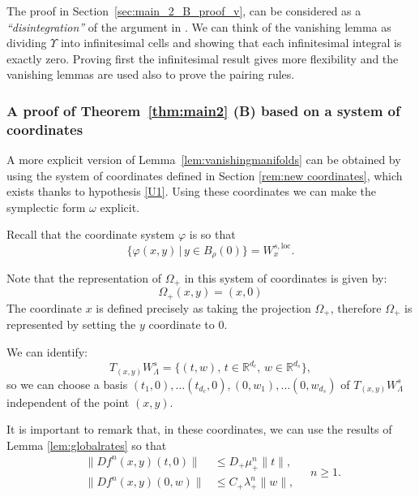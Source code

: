 \documentclass[11pt]{amsart}
\theoremstyle{definition}
\theoremstyle{remark}
\numberwithin{equation}{section}
\newcommand{\R}{\mathbb R}
\begin{document}
The proof in Section~\ref{sec:main_2_B_proof_v}, can be considered as a \emph{``disintegration''}
of the  argument in \cite{DLS08}. We can think of the vanishing lemma as dividing
$\Upsilon$ into infinitesimal cells and showing that each infinitesimal integral is exactly zero.
Proving first the infinitesimal result gives more flexibility
and the vanishing lemmas are used also to prove the pairing rules.






\subsubsection{A proof  of Theorem~\ref{thm:main2}  (B)  based on a system of coordinates }
\label{sec:proof_main_2_b_2}

A more explicit version  of Lemma~\ref{lem:vanishingmanifolds}
can be obtained by  using the system of coordinates defined in Section \ref{rem:new coordinates}, which exists thanks to hypothesis \eqref{U1}.
Using these coordinates we can make the symplectic form $\omega$ explicit.


Recall that the coordinate system $\varphi$ is so that
\[
\{\varphi(x,y)\,|\, y\in B_\rho(0)\}=W^{s,\mathrm{loc}}_x.
\]

Note that the representation of $\Omega_+$ in this system of
coordinates is  given  by:
\begin{equation}\label{eqn:Omega_plus coords}
\Omega_+(x,y) = (x, 0)
\end{equation}
The coordinate $x$ is defined precisely as taking the
projection $\Omega_+$, therefore $\Omega_+$ is represented
by setting the $y$ coordinate to $0$.


We can identify:
\[
T_{(x,y)}W^s_\Lambda=\{(t,w),\, t \in \R ^{d_c},\, w \in \R ^{d_s}\} ,
\]
so we can choose a basis $(t_1,0), \dots (t_{d_c},0), (0,w_1),\dots (0, w_{d_s})$ of $T_{(x,y)} W^s_\Lambda$ independent of the point $(x,y)$.


It is important to remark that, in these  coordinates, we can use the results of Lemma \ref{lem:globalrates} so that
\begin{equation}\label{eq:vsn}
\begin{split}
\|Df^{n}(x,y)(t,0) \| &\le D_+\mu_+^n \|t\|,\\
\|Df^{n}(x, y)(0,w) \| & \le C _+\lambda _ +^n \|w\|,
\end{split}
\quad n\ge 1 .
\end{equation}
\end{document}
